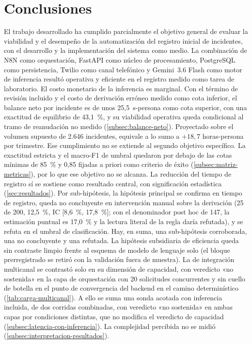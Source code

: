 \section{Conclusiones}\label{sec:conclusiones}

El trabajo desarrollado ha cumplido parcialmente el objetivo general de evaluar la viabilidad y el desempeño de la automatización del registro inicial de incidentes, con el desarrollo y la implementación del sistema como medio. La combinación de N8N como orquestación, FastAPI como núcleo de procesamiento, PostgreSQL como persistencia, Twilio como canal telefónico y Gemini~3.6 Flash como motor de inferencia resultó operativa y eficiente en el registro medido como tarea de laboratorio. El costo monetario de la inferencia es marginal. Con el término de revisión incluido y el costo de derivación erróneo medido como cota inferior, el balance neto por incidente es de unos 25,5~s-persona como cota superior, con una exactitud de equilibrio de 43,1~\%, y su viabilidad operativa queda condicional al tramo de reanudación no medido (\autoref{subsec:balance-neto}). Proyectado sobre el volumen supuesto de 2.646 incidentes, equivale a lo sumo a \(+18{,}7\) horas-persona por trimestre. Ese cumplimiento no se extiende al segundo objetivo específico. La exactitud estricta y el macro-F1 de umbral quedaron por debajo de las cotas mínimas de 85~\% y 0,85 fijadas a priori como criterio de éxito (\autoref{subsec:matriz-metricas}), por lo que ese objetivo no se alcanza. La reducción del tiempo de registro sí se sostiene como resultado central, con significación estadística (\autoref{sec:resultados}). Por sub-hipótesis, la hipótesis principal se confirma en tiempo de registro, queda no concluyente en intervención manual sobre la derivación (25 de 200, 12,5~\%, IC [8,6~\%, 17,8~\%]; con el denominador post hoc de 147, la estimación puntual es 17,0~\% y la lectura literal de la regla daría refutada), y se refuta en el umbral de clasificación. Hay, en suma, una sub-hipótesis corroborada, una no concluyente y una refutada. La hipótesis subsidiaria de eficiencia queda sin contraste limpio frente al esquema de modelo de lenguaje solo (el bloque prerregistrado se retiró con la validación fuera de muestra). La de integración multicanal se contrastó solo en su dimensión de capacidad, con veredicto «no sostenida» en la capa de orquestación con 20 solicitudes concurrentes y sin cuello de botella en el punto de convergencia del backend en el camino determinístico (\autoref{tab:carga-multicanal}). A ello se suma una sonda acotada con inferencia incluida, de dos corridas combinadas, con veredicto «no sostenida» en ambas capas por condiciones distintas, que no modifica el veredicto de capacidad (\autoref{subsec:latencia-con-inferencia}). La complejidad percibida no se midió (\autoref{subsec:interpretacion-resultados}).

